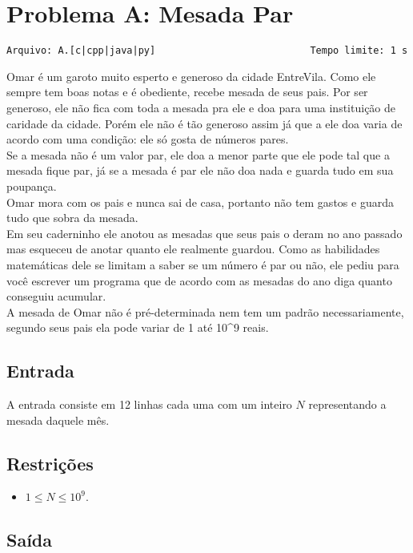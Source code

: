 \section{Problema A: Mesada Par}
\vspace{-0.52cm}
\noindent \begin{verbatim}Arquivo: A.[c|cpp|java|py]                           Tempo limite: 1 s
\end{verbatim}

Omar é um garoto muito esperto e generoso da cidade EntreVila. Como ele sempre tem boas notas e é obediente, recebe mesada de seus pais. Por ser generoso, ele não fica com toda a mesada pra ele e doa para uma instituição de caridade da cidade. Porém ele não é tão generoso assim já que a ele doa varia de acordo com uma condição: ele só gosta de números pares. \\
Se a mesada não é um valor par, ele doa a menor parte que ele pode tal que a mesada fique par, já se a mesada é par ele não doa nada e guarda tudo em sua poupança. \\
Omar mora com os pais e nunca sai de casa, portanto não tem gastos e guarda tudo que sobra da mesada. \\
Em seu caderninho ele anotou as mesadas que seus pais o deram no ano passado mas esqueceu de anotar quanto ele realmente guardou. Como as habilidades matemáticas dele se limitam a saber se um número é par ou não, ele pediu para você escrever um programa que de acordo com as mesadas do ano diga quanto conseguiu acumular. \\

A mesada de Omar não é pré-determinada nem tem um padrão necessariamente, segundo seus pais ela pode variar de 1 até 10^{9} reais.

\subsection*{Entrada}

A entrada consiste em 12 linhas cada uma com um inteiro $N$ representando a mesada daquele mês.

\subsection*{Restrições}
\begin{itemize}
    \item $1 \le N \le 10^{9}$.
\end{itemize}

\subsection*{Saída}

